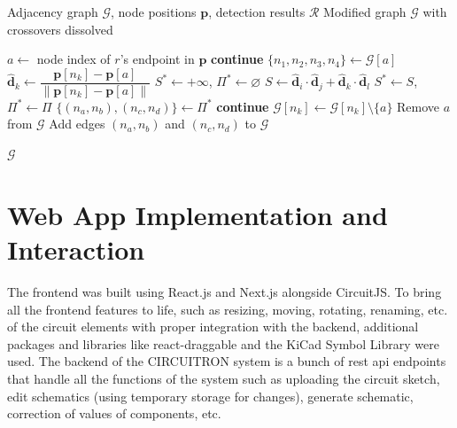 \begin{algorithm}[H]
\caption{Crossover Dissolution Algorithm}
\label{algo:crossover-dissolution}
\begin{algorithmic}[1]
\Require Adjacency graph $\mathcal{G}$, node positions $\mathbf{p}$, detection results $\mathcal{R}$
\Ensure Modified graph $\mathcal{G}$ with crossovers dissolved

    \State $a \gets$ node index of $r$'s endpoint in $\mathbf{p}$
        \State \textbf{continue}
    \EndIf
    \State $\{n_1, n_2, n_3, n_4\} \gets \mathcal{G}[a]$
        \State $\hat{\mathbf{d}}_k \gets \dfrac{\mathbf{p}[n_k] - \mathbf{p}[a]}{\|\mathbf{p}[n_k] - \mathbf{p}[a]\|}$
    \EndFor
    \State $S^* \gets +\infty$, \; $\Pi^* \gets \varnothing$
        \State $S \gets \hat{\mathbf{d}}_i \cdot \hat{\mathbf{d}}_j + \hat{\mathbf{d}}_k \cdot \hat{\mathbf{d}}_l$
            \State $S^* \gets S$, \; $\Pi^* \gets \Pi$
        \EndIf
    \EndFor
    \State $\{(n_a, n_b), (n_c, n_d)\} \gets \Pi^*$
        \State \textbf{continue}
    \EndIf
        \State $\mathcal{G}[n_k] \gets \mathcal{G}[n_k] \setminus \{a\}$
    \EndFor
    \State Remove $a$ from $\mathcal{G}$
    \State Add edges $(n_a, n_b)$ and $(n_c, n_d)$ to $\mathcal{G}$
\EndFor

\State \Return $\mathcal{G}$
\end{algorithmic}
\end{algorithm}

\section{Web App Implementation and Interaction}

The frontend was built using React.js and Next.js alongside CircuitJS. To bring all the frontend features to life, such as resizing, moving, rotating, renaming, etc. of the circuit elements with proper integration with the backend, additional packages and libraries like react-draggable and the KiCad Symbol Library were used. The backend of the CIRCUITRON system is a bunch of \gls{rest} \gls{api} endpoints that handle all the functions of the system such as uploading the circuit sketch, edit schematics (using temporary storage for changes), generate schematic, correction of values of components, etc.

